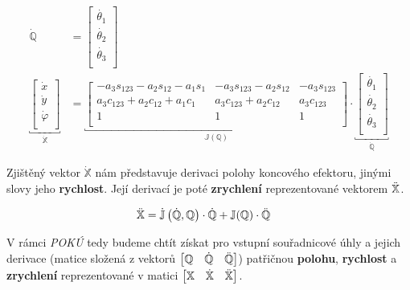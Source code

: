\documentclass{article}
\begin{document}
				\begin{align}
					\dot{\mathbb{Q}} &= \begin{bmatrix}
						\dot{\theta_1} \\
						\dot{\theta_2} \\
						\dot{\theta_3} \\
					\end{bmatrix} \label{eq:poku:dotq} \\
					\underbracket{\begin{bmatrix}
							\dot{x} \\
							\dot{y} \\
							\dot{\varphi} \\
					\end{bmatrix}}_{\dot{\mathbb{X}}} &= \underbracket{\begin{bmatrix}
							-a_3s_{123}-a_2s_{12}-a_1s_1 & -a_3s_{123}-a_2s_{12} & -a_3s_{123} \\
							a_3c_{123}+a_2c_{12}+a_1c_1 & a_3c_{123}+a_2c_{12} & a_3c_{123} \\
							1 & 1 & 1 \\
					\end{bmatrix}}_{\mathbb{J}(\mathbb{Q})} \cdot \underbracket{\begin{bmatrix}
							\dot{\theta_1} \\
							\dot{\theta_2} \\
							\dot{\theta_3} \\
					\end{bmatrix}}_{\dot{\mathbb{Q}}} \label{eq:poku:jb_matrix}
				\end{align}
		
			\noindent Zjištěný vektor \(\dot{\mathbb{X}}\) nám představuje derivaci polohy koncového efektoru, jinými slovy jeho \textbf{rychlost}. Její derivací je poté \textbf{zrychlení} reprezentované vektorem \(\Ddot{\mathbb{X}}\).
		
				\begin{align}
					\Ddot{\mathbb{X}} &= \dot{\mathbb{J}}\left(\dot{\mathbb{Q}},\mathbb{Q}\right)\cdot\dot{\mathbb{Q}} + \mathbb{J}(\mathbb{Q})\cdot\Ddot{\mathbb{Q}} \label{eq:poku:zrychleni}
				\end{align}
		
			\noindent V rámci \emph{POKÚ} tedy budeme chtít získat pro vstupní souřadnicové úhly a jejich derivace (matice složená z vektorů \(\begin{bmatrix}
				\mathbb{Q} & \dot{\mathbb{Q}} & \Ddot{\mathbb{Q}} \\
			\end{bmatrix}\)) patřičnou \textbf{polohu}, \textbf{rychlost} a \textbf{zrychlení} reprezentované v matici \(\begin{bmatrix}
				\mathbb{X} & \dot{\mathbb{X}} & \Ddot{\mathbb{X}} \\
			\end{bmatrix}\).
		
\end{document}
